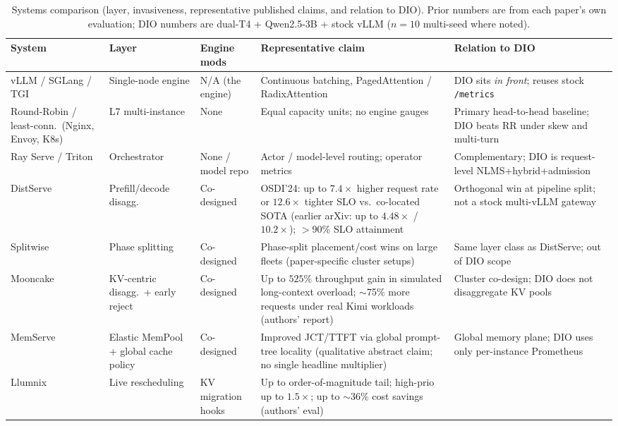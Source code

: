 \documentclass[pdflatex,sn-mathphys-num]{sn-jnl}
\begin{document}
\begin{table}[ht]
\caption{Systems comparison (layer, invasiveness, representative published claims,
and relation to DIO). Prior numbers are from each paper's own evaluation; DIO
numbers are dual-T4 + Qwen2.5-3B + stock vLLM ($n{=}10$ multi-seed where noted).}
\label{tab:sys-compare}
\centering
\footnotesize
\setlength{\tabcolsep}{3pt}
\begin{tabular}{@{}p{1.55cm}p{2.0cm}p{1.35cm}p{3.55cm}p{3.7cm}@{}}
\toprule
System & Layer & Engine mods & Representative claim & Relation to DIO \\
\midrule
vLLM / SGLang / TGI
  & Single-node engine
  & N/A (the engine)
  & Continuous batching, PagedAttention / RadixAttention
  & DIO sits \emph{in front}; reuses stock \texttt{/metrics} \\
Round-Robin / least-conn.\ (Nginx, Envoy, K8s)
  & L7 multi-instance
  & None
  & Equal capacity units; no engine gauges
  & Primary head-to-head baseline; DIO beats RR under skew and multi-turn \\
Ray Serve / Triton
  & Orchestrator
  & None / model repo
  & Actor / model-level routing; operator metrics
  & Complementary; DIO is request-level NLMS+hybrid+admission \\
DistServe~\cite{distserve}
  & Prefill/decode disagg.
  & Co-designed
  & OSDI'24: up to $7.4\times$ higher request rate or $12.6\times$ tighter SLO vs.\ co-located SOTA (earlier arXiv: up to $4.48\times$ / $10.2\times$); $>$90\% SLO attainment
  & Orthogonal win at pipeline split; not a stock multi-vLLM gateway \\
Splitwise~\cite{splitwise}
  & Phase splitting
  & Co-designed
  & Phase-split placement/cost wins on large fleets (paper-specific cluster setups)
  & Same layer class as DistServe; out of DIO scope \\
Mooncake~\cite{mooncake}
  & KV-centric disagg.\ + early reject
  & Co-designed
  & Up to $525\%$ throughput gain in simulated long-context overload; $\sim$75\% more requests under real Kimi workloads (authors' report)
  & Cluster co-design; DIO does not disaggregate KV pools \\
MemServe~\cite{memserve}
  & Elastic MemPool + global cache policy
  & Co-designed
  & Improved JCT/TTFT via global prompt-tree locality (qualitative abstract claim; no single headline multiplier)
  & Global memory plane; DIO uses only per-instance Prometheus \\
Llumnix~\cite{llumnix}
  & Live rescheduling
  & KV migration hooks
  & Up to order-of-magnitude tail; high-prio up to $1.5\times$; up to $\sim$36\% cost savings (authors' eval)

\end{tabular}
\end{table}
\end{document}

